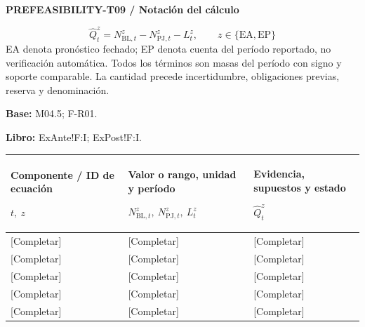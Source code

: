 \par\begingroup\sffamily\fontsize{8}{10}\selectfont\color{NEBGreen}\setlength{\parskip}{2pt}\setlength{\abovedisplayskip}{4pt}\setlength{\belowdisplayskip}{4pt}\setlength{\abovedisplayshortskip}{2pt}\setlength{\belowdisplayshortskip}{3pt}
\textbf{PREFEASIBILITY-T09 / Notación del cálculo}\par
{\fontsize{9}{11}\selectfont\[ \widehat Q_t^z=N_{\mathrm{BL},t}^z-N_{\mathrm{PJ},t}^z-L_t^z,\qquad z\in\{\mathrm{EA},\mathrm{EP}\} \]}
EA denota pronóstico fechado; EP denota cuenta del período reportado, no verificación automática. Todos los términos son masas del período con signo y soporte comparable. La cantidad precede incertidumbre, obligaciones previas, reserva y denominación.\par
\textbf{Base:} M04.5; F-R01.\par
\textbf{Libro:} ExAnte!F:I; ExPost!F:I.\par\endgroup
{\sffamily\fontsize{8.3}{10.3}\selectfont\begin{longtable}{@{}P{51.14mm} P{49.49mm} P{64.34mm}@{}}
\toprule
\textbf{Componente / ID de ecuación}\par {\normalfont\fontsize{8.2}{10}\selectfont $t,\ z$} & \textbf{Valor o rango, unidad y período}\par {\normalfont\fontsize{8.2}{10}\selectfont $N_{\mathrm{BL},t}^z,\ N_{\mathrm{PJ},t}^z,\ L_t^z$} & \textbf{Evidencia, supuestos y estado}\par {\normalfont\fontsize{8.2}{10}\selectfont $\widehat Q_t^z$}\\\midrule\endhead
\rule{0pt}{7.7mm}[Completar] & [Completar] & [Completar]\\\hline
\rule{0pt}{7.7mm}[Completar] & [Completar] & [Completar]\\\hline
\rule{0pt}{7.7mm}[Completar] & [Completar] & [Completar]\\\hline
\rule{0pt}{7.7mm}[Completar] & [Completar] & [Completar]\\\hline
\rule{0pt}{7.7mm}[Completar] & [Completar] & [Completar]\\\hline
\end{longtable}}
\par\begingroup\sffamily\fontsize{8}{10}\selectfont\color{NEBGreen}\setlength{\parskip}{2pt}\setlength{\abovedisplayskip}{4pt}\setlength{\belowdisplayskip}{4pt}\setlength{\abovedisplayshortskip}{2pt}\setlength{\belowdisplayshortskip}{3pt}
